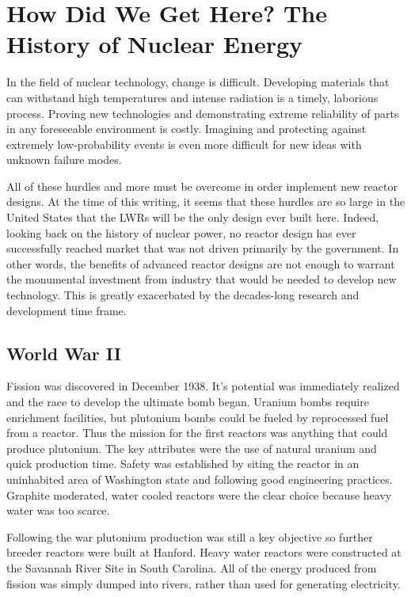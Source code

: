 \chapter{How Did We Get Here? The History of Nuclear Energy}
In the field of nuclear technology, change is difficult. Developing materials that can withstand high temperatures and intense radiation is a timely, laborious process. 
Proving new technologies and demonstrating extreme reliability of parts  in any foreseeable environment is costly.
Imagining and protecting against extremely low-probability events is even more difficult for new ideas with unknown failure modes.

All of these hurdles and more must be overcome in order implement new reactor designs. At the time of this writing, it seems that these hurdles are so large in the United States that the LWRs will be the only design ever built here.
Indeed, looking back on the history of nuclear power, no reactor design has ever successfully reached market that was not driven primarily by the government. In other words, the benefits of advanced reactor designs are not enough to warrant the monumental investment from industry that would be needed to develop new technology. This is greatly exacerbated by the decades-long research and development time frame.

\section{World War II}
Fission was discovered in December 1938. It's potential was immediately realized and the race to develop the ultimate bomb began. Uranium bombs require enrichment facilities, but plutonium bombs could be fueled by reprocessed fuel from a reactor. Thus the mission for the first reactors was anything that could produce plutonium. The key attributes were the use of natural uranium and quick production time. Safety was established by siting the reactor in an uninhabited area of Washington state and following good engineering practices. Graphite moderated, water cooled reactors were the clear choice because heavy water was too scarce.

Following the war plutonium production was still a key objective so further breeder reactors were built at Hanford. Heavy water reactors were constructed at the Savannah River Site in South Carolina. All of the energy produced from fission was simply dumped into rivers, rather than used for generating electricity.


